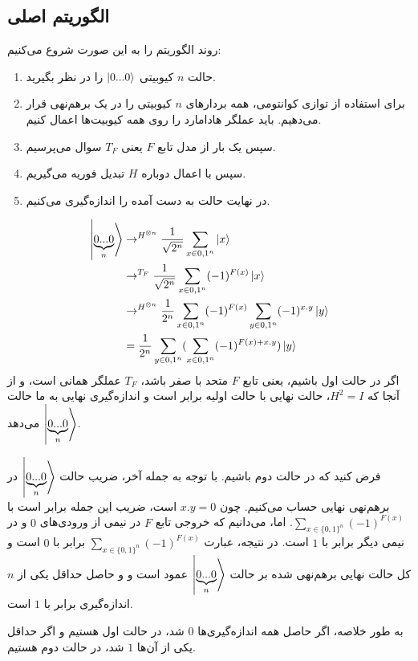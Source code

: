  \subsection{الگوریتم اصلی}
  روند الگوریتم را به این صورت شروع می‌کنیم:
   \begin{enumerate}
   	\item حالت $n$ کیوبیتی $\ket{0...0}$ را در نظر بگیرید. 
   	\item برای استفاده از توازی کوانتومی، همه بردارهای $n$ کیوبیتی را در یک برهم‌نهی قرار می‌دهیم. باید عملگر هادامارد را روی همه کیوبیت‌ها اعمال کنیم. 
   	\item  سپس یک بار از مدل تابع $F$ یعنی $T_{F}$ سوال می‌پرسیم. 
   	\item سپس با اعمال دوباره $H$ تبدیل فوریه می‌گیریم. 
   	 \item در نهایت حالت به دست آمده را اندازه‌گیری می‌کنیم. 
   \end{enumerate}
   \begin{equation}
   \begin{split}
   \ket{\underbrace{0...0}_{n}} & \rightarrow^{H^{\otimes n}} \frac{1}{\sqrt{2^{n}}} \sum_{x \in {0,1}^{n}} \ket{x} \\
   & \rightarrow^{T_{F}} \frac{1}{\sqrt{2^{n}}} \sum_{x \in {0,1}^{n}} (-1)^{F(x)} \ket{x} \\
   & \rightarrow^{H^{\otimes n}} \frac{1}{2^{n}} \sum_{x \in {0,1}^{n}}  (-1)^{F(x)} \sum_{y \in {0,1}^{n}} (-1)^{x.y}\ket{y} \\
   & =  \frac{1}{2^{n}} \sum_{y \in {0,1}^{n}} (\sum_{x \in {0,1}^{n}}  (-1)^{F(x) + x.y})\ket{y}
 \end{split}
   \end{equation}
   اگر در حالت اول باشیم، یعنی تابع $F$ متحد با صفر باشد، $T_{F}$ عملگر همانی است، و از آنجا که $H^{2} = I$، حالت نهایی با حالت اولیه برابر است و اندازه‌گیری نهایی به ما حالت $\ket{\underbrace{0...0}_{n}}$ می‌‌دهد. 
   
   فرض کنید که در حالت دوم باشیم. با توجه به جمله آخر، ضریب حالت 
   $\ket{\underbrace{0...0}_{n}}$ 
   در برهم‌نهی نهایی حساب می‌کنیم. چون $x.y = 0$ است، ضریب این جمله برابر است با 
   $\sum_{x \in \{0,1\}^{n}}  (-1)^{F(x)}$. اما، می‌دانیم که خروجی تابع $F$ در نیمی از ورودی‌های $0$ و در نیمی دیگر برابر با $1$ است. در نتیجه، عبارت $\sum_{x \in \{0,1\}^{n}}  (-1)^{F(x)}$ برابر با $0$ است و کل حالت نهایی برهم‌نهی شده بر حالت
     $\ket{\underbrace{0...0}_{n}}$ عمود است و و حاصل حداقل یکی از $n$ اندازه‌گیری برابر با $1$ است. 
   
   به طور خلاصه، اگر حاصل همه اندازه‌گیری‌ها $0$ شد، در حالت اول هستیم و اگر حداقل یکی از آن‌ها $1$ شد، در حالت دوم هستیم. 
   
